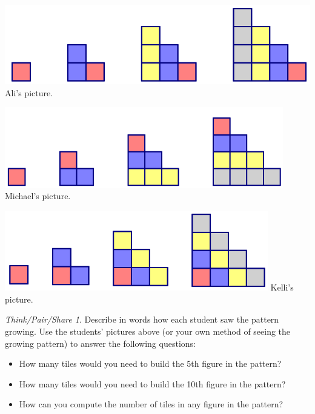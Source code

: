 \documentclass[12pt, reqno]{amsart}
\theoremstyle{remark}
\newtheorem*{thinkpair*}{Think/Pair/Share}
\theoremstyle{definition}
\numberwithin{equation}{section}  %
\begin{document}
\begin{center}
\includegraphics[height=3.5cm]{growth1}
Ali's picture.

\includegraphics[height=3.5cm]{growth2}
Michael's picture.

\includegraphics[height=3.5cm]{growth3}
Kelli's picture.

\end{center}


\bigskip


\begin{thinkpair*}
Describe in words how each student saw the pattern growing.
Use the students' pictures above (or your own method of seeing the growing pattern) to answer the following questions:
\begin{itemize}
\item
How many tiles would you need to build the 5th figure in the pattern?\\

\item
How many tiles would you need to build the 10th figure in the pattern?\\


\item
How can you compute the number of tiles in any figure in the pattern?
\end{itemize}

\end{thinkpair*}
\end{document}
